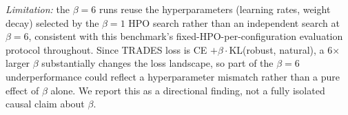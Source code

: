 \begin{table}[t]
\vspace{4pt}
\emph{Limitation:} the $\beta=6$ runs reuse the hyperparameters (learning
rates, weight decay) selected by the $\beta=1$ HPO search rather than an
independent search at $\beta=6$, consistent with this benchmark's
fixed-HPO-per-configuration evaluation protocol throughout. Since TRADES loss
is CE $+ \beta \cdot$KL(robust, natural), a 6$\times$ larger $\beta$
substantially changes the loss landscape, so part of the $\beta=6$
underperformance could reflect a hyperparameter mismatch rather than a pure
effect of $\beta$ alone. We report this as a directional finding, not a
fully isolated causal claim about $\beta$.
\end{table}
